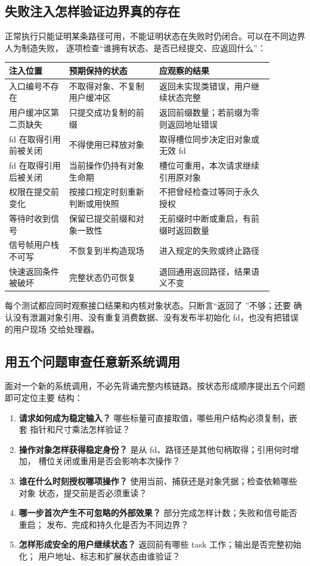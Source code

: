\subsection{失败注入怎样验证边界真的存在}

正常执行只能证明某条路径可用，不能证明状态在失败时仍闭合。可以在不同边界人为制造失败，
逐项检查“谁拥有状态、是否已经提交、应返回什么”：

\begin{longtable}{|L{0.20\linewidth}|L{0.30\linewidth}|L{0.38\linewidth}|}
\hline
注入位置 & 预期保持的状态 & 应观察的结果 \\ \hline
入口编号不存在 & 不取得对象、不复制用户缓冲区 & 返回未实现类错误，用户继续状态完整 \\ \hline
用户缓冲区第二页缺失 & 只提交成功复制的前缀 & 返回前缀数量；若前缀为零则返回地址错误 \\ \hline
fd 在取得引用前被关闭 & 不得使用已释放对象 & 取得槽位同步决定旧对象或无效 fd \\ \hline
fd 在取得引用后被关闭 & 当前操作仍持有对象生命期 & 槽位可重用，本次请求继续引用原对象 \\ \hline
权限在提交前变化 & 按接口规定时刻重新判断或用快照 & 不把曾经检查过等同于永久授权 \\ \hline
等待时收到信号 & 保留已提交前缀和对象一致性 & 无前缀时中断或重启，有前缀时返回数量 \\ \hline
信号帧用户栈不可写 & 不恢复到半构造现场 & 进入规定的失败或终止路径 \\ \hline
快速返回条件被破坏 & 完整状态仍可恢复 & 退回通用返回路径，结果语义不变 \\ \hline
\end{longtable}

每个测试都应同时观察接口结果和内核对象状态。只断言“返回了 ”不够；还要
确认没有泄漏对象引用、没有重复消费数据、没有发布半初始化 fd，也没有把错误的用户现场
交给处理器。

\subsection{用五个问题审查任意新系统调用}

面对一个新的系统调用，不必先背诵完整内核链路。按状态形成顺序提出五个问题即可定位主要
结构：

\begin{enumerate}
\item \textbf{请求如何成为稳定输入？} 哪些标量可直接取值，哪些用户结构必须复制，嵌套
      指针和尺寸乘法怎样验证？
\item \textbf{操作对象怎样获得稳定身份？} 是从 fd、路径还是其他句柄取得；引用何时增加，
      槽位关闭或重用是否会影响本次操作？
\item \textbf{谁在什么时刻授权哪项操作？} 使用当前、捕获还是对象凭据；检查依赖哪些对象
      状态，提交前是否必须重读？
\item \textbf{哪一步首次产生不可忽略的外部效果？} 部分完成怎样计数；失败和信号能否重启；
      发布、完成和持久化是否为不同边界？
\item \textbf{怎样形成安全的用户继续状态？} 返回前有哪些 task 工作；输出是否完整初始化；
      用户地址、标志和扩展状态由谁验证？
\end{enumerate}

